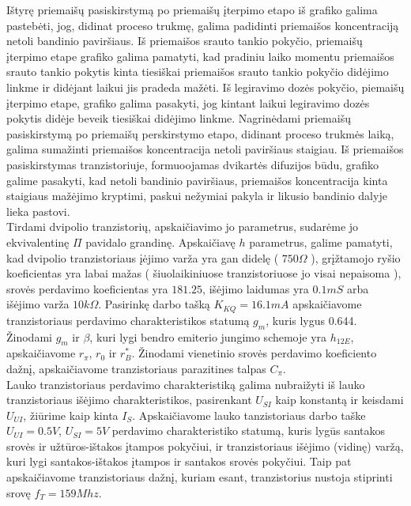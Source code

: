 \documentclass[11pt,a4paper]{article}
\begin{document}
Ištyrę priemaišų pasiskirstymą po priemaišų įterpimo etapo iš grafiko galima pastebėti, jog, didinat proceso 
trukmę, galima padidinti priemaišos koncentraciją netoli bandinio paviršiaus. Iš priemaišos srauto tankio pokyčio, 
priemaišų įterpimo etape grafiko galima pamatyti, kad pradiniu laiko momentu priemaišos srauto tankio pokytis 
kinta tiesiškai priemaišos srauto tankio pokyčio didėjimo linkme ir didėjant laikui jis pradeda mažėti. Iš legiravimo 
dozės pokyčio, piemaišų įterpimo etape, grafiko galima pasakyti, jog kintant laikui legiravimo dozės pokytis didėje beveik tiesiškai 
didėjimo linkme. Nagrinėdami priemaišų pasiskirstymą po priemaišų perskirstymo etapo, didinant proceso trukmės laiką, 
galima sumažinti priemaišos koncentracija netoli paviršiaus staigiau. Iš priemaišos pasiskirstymas tranzistoriuje, 
formuoojamas dvikartės difuzijos būdu, grafiko galime pasakyti, kad netoli bandinio paviršiaus, priemaišos koncentracija 
kinta staigiaus mažėjimo kryptimi, paskui nežymiai pakyla ir likusio bandinio dalyje lieka pastovi.\\

Tirdami dvipolio tranzistorių, apskaičiavimo jo parametrus, sudarėme jo ekvivalentinę $\Pi$ pavidalo grandinę. 
Apskaičiavę $h$ parametrus, galime pamatyti, kad dvipolio tranzistoriaus įėjimo varža yra gan didelę ( $750 \Omega$ ), 
grįžtamojo ryšio koeficientas yra labai mažas ( šiuolaikiniuose tranzistoriuose jo visai nepaisoma ), srovės perdavimo 
koeficientas yra $181.25$, išėjimo laidumas yra $0.1mS$ arba išėjimo varža $10k \Omega$. Pasirinkę darbo tašką 
$K_{KQ} = 16.1 mA$ apskaičiavome tranzistoriaus perdavimo charakteristikos statumą $g_m$, kuris lygus 0.644. Žinodami 
$g_m$ ir $\beta$, kuri lygi bendro emiterio jungimo schemoje yra $h_{12E}$, apskaičiavome $r_{\pi}$, $r_0$ ir $r_{B}^{*}$. 
Žinodami vienetinio srovės perdavimo koeficiento dažnį, apskaičiavome tranzistoriaus parazitines talpas $C_{\pi}$.\\

Lauko tranzistoriaus perdavimo charakteristiką galima nubraižyti iš lauko tranzistoriaus išėjimo charakteristikos, pasirenkant 
$U_{SI}$ kaip konstantą ir keisdami $U_{UI}$, žiūrime kaip kinta $I_{S}$. Apskaičiavome lauko tanzistoriaus darbo taške 
$U_{UI} = 0.5 V$, $U_{SI} = 5 V$ perdavimo charakteristiko statumą, kuris lygūs santakos srovės ir užtūros-ištakos įtampos 
pokyčiui, ir tranzistoriaus išėjimo (vidinę) varžą, kuri lygi santakos-ištakos įtampos ir santakos srovės pokyčiui. Taip pat 
apskaičiavome tranzistoriaus dažnį, kuriam esant, tranzistorius nustoja stiprinti srovę $f_T = 159 Mhz$.\\
\end{document}
